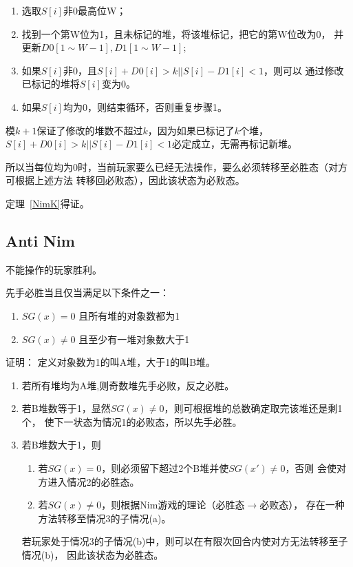 \begin{enumerate}
	\item 选取$S[i]$非0最高位W；
	\item 找到一个第W位为1，且未标记的堆，将该堆标记，把它的第W位改为0，
	      并更新$D0[1\sim W-1],D1[1\sim W-1]$;
	\item 如果$S[i]$非0，且$S[i]+D0[i]>k || S[i]-D1[i]<1$，则可以
	      通过修改已标记的堆将$S[i]$变为0。
	\item 如果$S[i]$均为0，则结束循环，否则重复步骤1。
\end{enumerate}

模$k+1$保证了修改的堆数不超过$k$，因为如果已标记了$k$个堆，$S[i]+D0[i]>k ||
	S[i]-D1[i]<1$必定成立，无需再标记新堆。

所以当每位均为0时，当前玩家要么已经无法操作，要么必须转移至必胜态（对方可根据上述方法
转移回必败态），因此该状态为必败态。

定理~\ref{NimK}得证。

\subsection{Anti Nim}


不能操作的玩家胜利。

\begin{theorem}\label{AntiNim}
	先手必胜当且仅当满足以下条件之一：
	\begin{enumerate}
		\item $SG(x)=0$ 且所有堆的对象数都为1
		\item $SG(x)\neq 0$ 且至少有一堆对象数大于1
	\end{enumerate}

\end{theorem}

证明：
定义对象数为1的叫A堆，大于1的叫B堆。

\begin{enumerate}
	\item 若所有堆均为A堆,则奇数堆先手必败，反之必胜。
	\item 若B堆数等于1，显然$SG(x)\neq 0$，则可根据堆的总数确定取完该堆还是剩1个，
	      使下一状态为情况1的必败态，所以先手必胜。
	\item 若B堆数大于1，则
	      \begin{enumerate}
		      \item 若$SG(x)=0$，则必须留下超过2个B堆并使$SG(x')\neq 0$，否则
		            会使对方进入情况2的必胜态。
		      \item 若$SG(x)\neq 0$，则根据Nim游戏的理论（必胜态$\rightarrow$必败态），
		            存在一种方法转移至情况3的子情况(a)。
	      \end{enumerate}
	      若玩家处于情况3的子情况(b)中，则可以在有限次回合内使对方无法转移至子情况(b)，
	      因此该状态为必胜态。
\end{enumerate}

